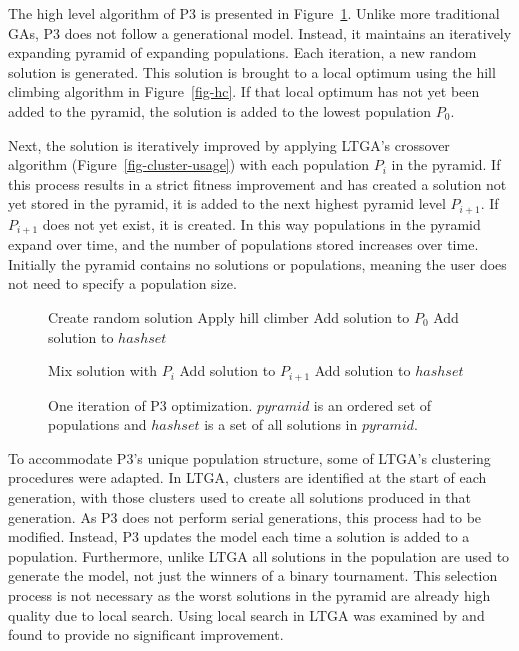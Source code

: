 \documentclass[twoside]{article}
\begin{document}
The high level algorithm of P3 is presented in Figure~\ref{fig-p3}. Unlike more traditional
GAs, P3 does not follow a generational model. Instead, it maintains an iteratively
expanding pyramid of expanding populations. Each iteration, a new random solution is generated.
This solution is brought to a local optimum using the hill climbing algorithm in Figure~\ref{fig-hc}. If that
local optimum has not yet been added to the pyramid, the solution is added to the lowest
population $P_0$.

Next, the solution is iteratively improved by applying LTGA's crossover algorithm (Figure~\ref{fig-cluster-usage})
with each population $P_i$ in the pyramid. If this process results in a strict fitness improvement and has
created a solution not yet stored in the pyramid, it is added to the next highest pyramid level $P_{i+1}$.
If $P_{i+1}$ does not yet exist, it is created. In this way populations in the pyramid expand over time,
and the number of populations stored increases over time. Initially the pyramid contains no solutions
or populations, meaning the user does not need to specify a population size.


\begin{figure}
  \begin{algorithmic}[1]
    \State Create random solution
    \State Apply hill climber
      \State Add solution to $P_0$
      \State Add solution to $hashset$
    \EndIf

      \State Mix solution with $P_i$
          \State Add solution to $P_{i+1}$
          \State Add solution to $hashset$
        \EndIf
      \EndIf
    \EndFor
  \EndProcedure
\end{algorithmic}
  \caption{One iteration of P3 optimization. $pyramid$ is an
           ordered set of populations and $hashset$ is a set
           of all solutions in $pyramid$.}
  \label{fig-p3}
\end{figure}

To accommodate P3's unique population structure, some of LTGA's clustering procedures were adapted. In LTGA,
clusters are identified at the start of each generation, with those clusters used
to create all solutions produced in that generation. As P3 does not perform serial
generations, this process had to be modified. Instead, P3 updates the model each
time a solution is added to a population. Furthermore, unlike
LTGA all solutions in the population are used to generate the model, not just the
winners of a binary tournament. This selection process is not necessary as the
worst solutions in the pyramid are already high quality due to local search.
Using local search in LTGA was examined by \cite{bosman:2011:lsbbo} and found
to provide no significant improvement.
\end{document}
